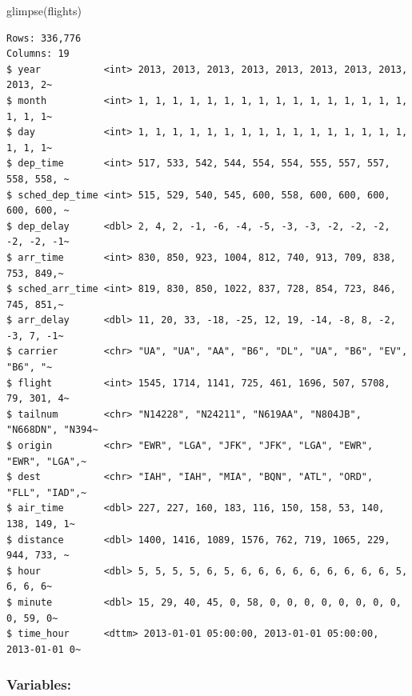 \documentclass[
  10pt,
  letterpaper,
  DIV=11,
  numbers=noendperiod]{scrartcl}
\newenvironment{Shaded}{\begin{snugshade}}{\end{snugshade}}
\newcommand{\FunctionTok}[1]{\textcolor[rgb]{0.28,0.35,0.67}{#1}}
\newcommand{\NormalTok}[1]{\textcolor[rgb]{0.00,0.23,0.31}{#1}}
\begin{document}
\begin{Shaded}
\begin{Highlighting}[numbers=left,,]
\FunctionTok{glimpse}\NormalTok{(flights)}
\end{Highlighting}
\end{Shaded}

\begin{verbatim}
Rows: 336,776
Columns: 19
$ year           <int> 2013, 2013, 2013, 2013, 2013, 2013, 2013, 2013, 2013, 2~
$ month          <int> 1, 1, 1, 1, 1, 1, 1, 1, 1, 1, 1, 1, 1, 1, 1, 1, 1, 1, 1~
$ day            <int> 1, 1, 1, 1, 1, 1, 1, 1, 1, 1, 1, 1, 1, 1, 1, 1, 1, 1, 1~
$ dep_time       <int> 517, 533, 542, 544, 554, 554, 555, 557, 557, 558, 558, ~
$ sched_dep_time <int> 515, 529, 540, 545, 600, 558, 600, 600, 600, 600, 600, ~
$ dep_delay      <dbl> 2, 4, 2, -1, -6, -4, -5, -3, -3, -2, -2, -2, -2, -2, -1~
$ arr_time       <int> 830, 850, 923, 1004, 812, 740, 913, 709, 838, 753, 849,~
$ sched_arr_time <int> 819, 830, 850, 1022, 837, 728, 854, 723, 846, 745, 851,~
$ arr_delay      <dbl> 11, 20, 33, -18, -25, 12, 19, -14, -8, 8, -2, -3, 7, -1~
$ carrier        <chr> "UA", "UA", "AA", "B6", "DL", "UA", "B6", "EV", "B6", "~
$ flight         <int> 1545, 1714, 1141, 725, 461, 1696, 507, 5708, 79, 301, 4~
$ tailnum        <chr> "N14228", "N24211", "N619AA", "N804JB", "N668DN", "N394~
$ origin         <chr> "EWR", "LGA", "JFK", "JFK", "LGA", "EWR", "EWR", "LGA",~
$ dest           <chr> "IAH", "IAH", "MIA", "BQN", "ATL", "ORD", "FLL", "IAD",~
$ air_time       <dbl> 227, 227, 160, 183, 116, 150, 158, 53, 140, 138, 149, 1~
$ distance       <dbl> 1400, 1416, 1089, 1576, 762, 719, 1065, 229, 944, 733, ~
$ hour           <dbl> 5, 5, 5, 5, 6, 5, 6, 6, 6, 6, 6, 6, 6, 6, 6, 5, 6, 6, 6~
$ minute         <dbl> 15, 29, 40, 45, 0, 58, 0, 0, 0, 0, 0, 0, 0, 0, 0, 59, 0~
$ time_hour      <dttm> 2013-01-01 05:00:00, 2013-01-01 05:00:00, 2013-01-01 0~
\end{verbatim}

\subsubsection{Variables:}\label{variables}
\end{document}
